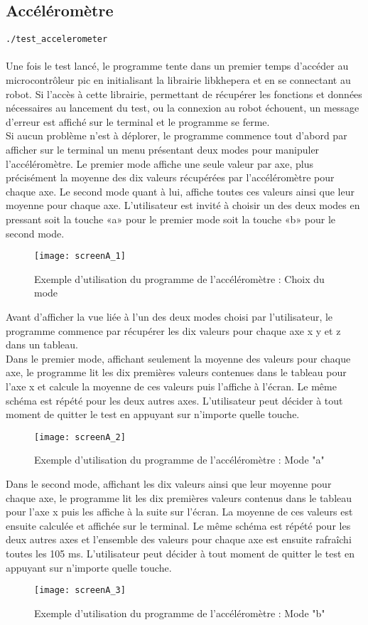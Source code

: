 \documentclass[11pt]{article} %
\begin{document}
\subsection{Accéléromètre}
\verb|./test_accelerometer|\\ 
 \\
Une fois le test lancé, le programme tente dans un premier temps d’accéder au microcontrôleur pic en initialisant la librairie libkhepera et en se connectant au robot. Si l’accès à cette librairie, permettant de récupérer les fonctions et données nécessaires au lancement du test, ou la connexion au robot échouent, un message d’erreur est affiché sur le terminal et le programme se ferme.\\
Si aucun problème n’est à déplorer, le programme commence tout d’abord par afficher sur le terminal un menu présentant deux modes pour manipuler l’accéléromètre. Le premier mode affiche une seule valeur par axe, plus précisément la moyenne des dix valeurs récupérées par l’accéléromètre pour chaque axe. Le second mode quant à lui, affiche toutes ces valeurs ainsi que leur moyenne pour chaque axe. L’utilisateur est invité à choisir un des deux modes en pressant soit la touche «a» pour le premier mode soit la touche «b» pour le second mode.\\
\begin{figure}[H]
	\caption{Exemple d'utilisation du programme de l'accéléromètre : Choix du mode}
	\texttt{[image: screenA\_1]}
\end{figure}
Avant d’afficher la vue liée à l’un des deux modes choisi par l’utilisateur, le programme commence par récupérer les dix valeurs pour chaque axe x y et z dans un tableau.\\ 
Dans le premier mode, affichant seulement la moyenne des valeurs pour chaque axe, le programme lit les dix premières valeurs contenues dans le tableau pour l’axe x et calcule la moyenne de ces valeurs puis l’affiche à l’écran. Le même schéma est répété pour les deux autres axes. L’utilisateur peut décider à tout moment de quitter le test en appuyant sur n’importe quelle touche.\\
\begin{figure}[H]
	\caption{Exemple d'utilisation du programme de l'accéléromètre : Mode "a"}
	\texttt{[image: screenA\_2]}
\end{figure}
Dans le second mode, affichant les dix valeurs ainsi que leur moyenne pour chaque axe, le programme lit les dix premières valeurs contenus dans le tableau pour l’axe x puis les affiche à la suite sur l’écran. La moyenne de ces valeurs est ensuite calculée et affichée sur le terminal. Le même schéma est répété pour les deux autres axes et l’ensemble des valeurs pour chaque axe est ensuite rafraîchi toutes les 105 ms. L’utilisateur peut décider à tout moment de quitter le test en appuyant sur n’importe quelle touche.\\
\begin{figure}[H]
	\centering
	\caption{Exemple d'utilisation du programme de l'accéléromètre : Mode "b"}
	\texttt{[image: screenA\_3]}
\end{figure}
\end{document}
